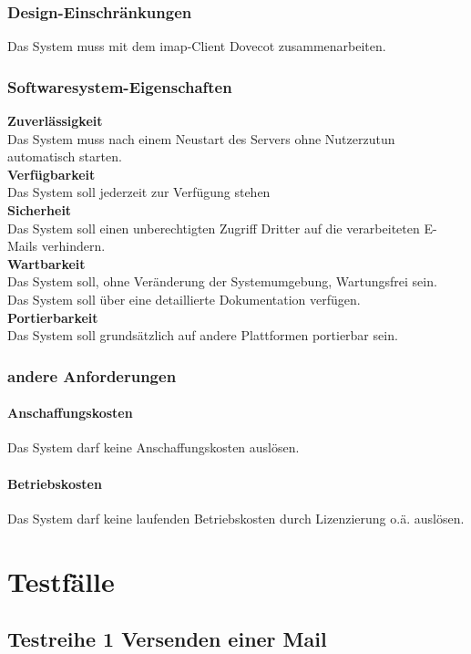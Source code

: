 \subsection{Design-Einschränkungen}
Das System muss mit dem \ac{imap}-Client Dovecot zusammenarbeiten.
\subsection{Softwaresystem-Eigenschaften}
\label{sec:zuverl}
\textbf{Zuverlässigkeit} \\
Das System muss nach einem Neustart des Servers ohne Nutzerzutun automatisch starten.\\
\textbf{Verfügbarkeit} \\
Das System soll jederzeit zur Verfügung stehen\\
\textbf{Sicherheit} \\
Das System soll einen unberechtigten Zugriff Dritter auf die verarbeiteten E-Mails verhindern.\\
\textbf{Wartbarkeit} \\
Das System soll, ohne Veränderung der Systemumgebung, Wartungsfrei sein.\\
Das System soll über eine detaillierte Dokumentation verfügen.\\
\textbf{Portierbarkeit} \\
Das System soll grundsätzlich auf andere Plattformen portierbar sein.\\

\subsection{andere Anforderungen}
\subsubsection*{Anschaffungskosten}
Das System darf keine Anschaffungskosten auslösen.
\subsubsection*{Betriebskosten}
Das System darf keine laufenden Betriebskosten durch Lizenzierung o.ä. auslösen.


\chapter{Testfälle}
\label{ch:Testfaelle}

\section{Testreihe 1 Versenden einer Mail}
